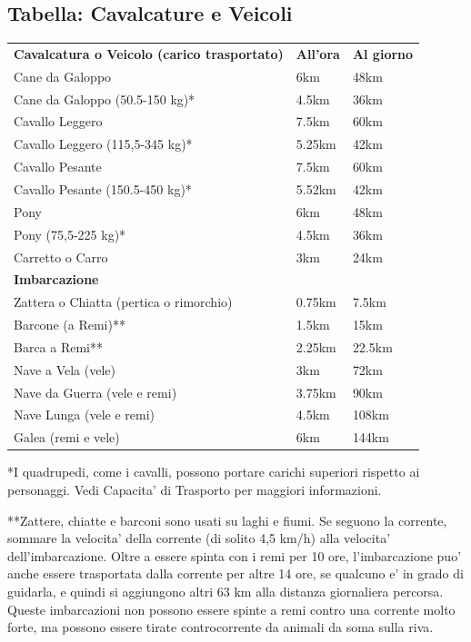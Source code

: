 \documentclass[a4paper,11pt,twoside,openany]{book}
\begin{document}
\subsection{Tabella: Cavalcature e Veicoli}

\medskip

\label{tabella-cavalcature-e-veicoli}

\begin{tabular}{lll}
\toprule
\textbf{Cavalcatura o Veicolo (carico trasportato)} & \textbf{All'ora} & \textbf{Al giorno}\tabularnewline
Cane da Galoppo &6km &48km\\
Cane da Galoppo (50.5-150 kg)* &4.5km& 36km\\
Cavallo Leggero& 7.5km &60km\\
Cavallo Leggero (115,5-345 kg)* &5.25km &42km\\
Cavallo Pesante &7.5km &60km\\
Cavallo Pesante (150.5-450 kg)* &5.52km& 42km\\
Pony &6km &48km\\
Pony (75,5-225 kg)* &4.5km &36km\\
Carretto o Carro &3km &24km\\
\textbf{Imbarcazione} &&\\
Zattera o Chiatta (pertica o rimorchio) & 0.75km &7.5km\\
Barcone (a Remi)** &1.5km &15km\\
Barca a Remi** &2.25km& 22.5km\\
Nave a Vela (vele) &3km &72km\\
Nave da Guerra (vele e remi) &3.75km& 90km\\
Nave Lunga (vele e remi) &4.5km& 108km\\
Galea (remi e vele) &6km& 144km\\
\end{tabular}

*I quadrupedi, come i cavalli, possono portare carichi superiori rispetto ai personaggi. Vedi Capacita' di Trasporto per maggiori informazioni.

**Zattere, chiatte e barconi sono usati su laghi e fiumi. Se seguono la corrente, sommare la velocita' della corrente (di solito 4,5 km/h) alla velocita' dell'imbarcazione. Oltre a essere spinta con i remi per 10 ore, l'imbarcazione puo' anche essere trasportata dalla corrente per altre 14 ore, se qualcuno e' in grado di guidarla, e quindi si aggiungono altri 63 km alla distanza giornaliera percorsa. Queste imbarcazioni non possono essere spinte a remi contro una corrente molto forte, ma possono essere tirate controcorrente da animali da soma sulla riva.
\end{document}
